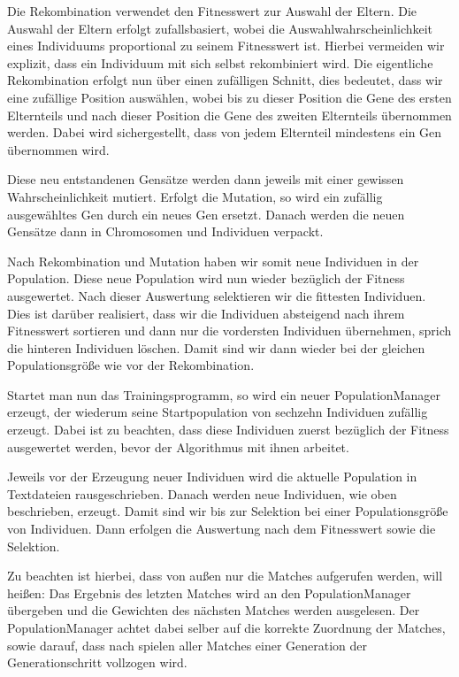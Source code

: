 \documentclass[
	12pt,
	a4paper,
	BCOR10mm,
	DIV14,
	headsepline,
	usegeometry,
]{scrreprt}
\begin{document}
Die Rekombination verwendet den Fitnesswert zur Auswahl der Eltern.
Die Auswahl der Eltern erfolgt zufallsbasiert, wobei die Auswahlwahrscheinlichkeit eines Individuums proportional zu seinem Fitnesswert ist.
Hierbei vermeiden wir explizit, dass ein Individuum mit sich selbst rekombiniert wird.
Die eigentliche Rekombination erfolgt nun über einen zufälligen Schnitt, dies bedeutet, dass wir eine zufällige Position auswählen, wobei bis zu dieser Position die Gene des ersten Elternteils und nach dieser Position die Gene des zweiten Elternteils übernommen werden.
Dabei wird sichergestellt, dass von jedem Elternteil mindestens ein Gen übernommen wird.

Diese neu entstandenen Gensätze werden dann jeweils mit einer gewissen Wahrscheinlichkeit mutiert.
Erfolgt die Mutation, so wird ein zufällig ausgewähltes Gen durch ein neues Gen ersetzt.
Danach werden die neuen Gensätze dann in Chromosomen und Individuen verpackt.

Nach Rekombination und Mutation haben wir somit neue Individuen in der Population.
Diese neue Population wird nun wieder bezüglich der Fitness ausgewertet.
Nach dieser Auswertung selektieren wir die fittesten Individuen.
Dies ist darüber realisiert, dass wir die Individuen absteigend nach ihrem Fitnesswert sortieren und dann nur die vordersten Individuen übernehmen, sprich die hinteren Individuen löschen.
Damit sind wir dann wieder bei der gleichen Populationsgröße wie vor der Rekombination.

Startet man nun das Trainingsprogramm, so wird ein neuer PopulationManager erzeugt, der wiederum seine Startpopulation von sechzehn Individuen zufällig erzeugt.
Dabei ist zu beachten, dass diese Individuen zuerst bezüglich der Fitness ausgewertet werden, bevor der Algorithmus mit ihnen arbeitet.

Jeweils vor der Erzeugung neuer Individuen wird die aktuelle Population in Textdateien rausgeschrieben.
Danach werden  neue Individuen, wie oben beschrieben, erzeugt.
Damit sind wir bis zur Selektion bei einer Populationsgröße von  Individuen.
Dann erfolgen die Auswertung nach dem Fitnesswert sowie die Selektion.

Zu beachten ist hierbei, dass von außen nur die Matches aufgerufen werden, will heißen: Das Ergebnis des letzten Matches wird an den PopulationManager übergeben und die Gewichten des nächsten Matches werden ausgelesen.
Der PopulationManager achtet dabei selber auf die korrekte Zuordnung der Matches, sowie darauf, dass nach spielen aller Matches einer Generation der Generationschritt vollzogen wird.
\end{document}
